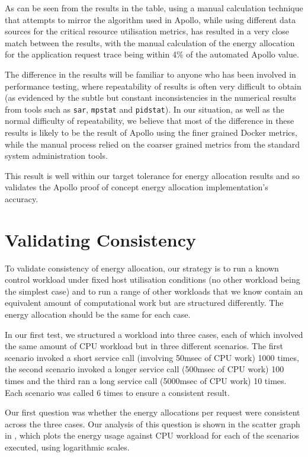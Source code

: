 As can be seen from the results in the table, using a manual calculation technique that attempts to mirror the algorithm used in Apollo, while using different data sources for the critical resource utilisation metrics, has resulted in a very close match between the results, with the manual calculation of the energy allocation for the application request trace being within 4\% of the automated Apollo value.

The difference in the results will be familiar to anyone who has been involved in performance testing, where repeatability of results is often very difficult to obtain (as evidenced by the subtle but constant inconsistencies in the numerical results from tools such as \texttt{sar}, \texttt{mpstat} and \texttt{pidstat}).  In our situation, as well as the normal difficulty of repeatability, we believe that most of the difference in these results is likely to be the result of Apollo using the finer grained Docker metrics, while the manual process relied on the coarser grained metrics from the standard system administration tools. 

This result is well within our target tolerance for energy allocation results and so validates the Apollo proof of concept energy allocation implementation's accuracy.

\section{Validating Consistency}

To validate consistency of energy allocation, our strategy is to run a known control workload under fixed host utilisation conditions (no other workload being the simplest case) and to run a range of other workloads that we know contain an equivalent amount of computational work but are structured differently.  The energy allocation should be the same for each case.

In our first test, we structured a workload into three cases, each of which involved the same amount of CPU workload but in three different scenarios.  The first scenario invoked a short service call (involving 50msec of CPU work) 1000 times, the second scenario invoked a longer service call (500msec of CPU work) 100 times and the third ran a long service call (5000msec of CPU work) 10 times.  Each scenario was called 6 times to ensure a consistent result.

Our first question was whether the energy allocations per request were consistent across the three cases.  Our analysis of this question is shown in the scatter graph in , which plots the energy usage against CPU workload for each of the scenarios executed, using logarithmic scales.

